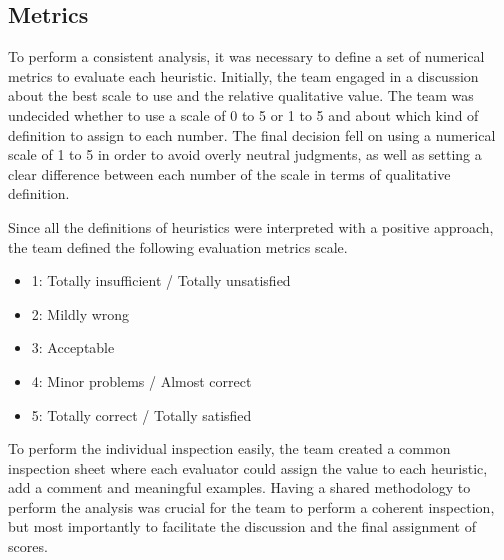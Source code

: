 
\subsection{Metrics}

To perform a consistent analysis, it was necessary to define a set of numerical metrics to evaluate each heuristic.
Initially, the team engaged in a discussion about the best scale to use and the relative qualitative value. The team was undecided whether to use a scale of 0 to 5 or 1 to 5 and about which kind of definition to assign to each number.
The final decision fell on using a numerical scale of 1 to 5 in order to avoid overly neutral judgments, as well as setting a clear difference between each number of the scale in terms of qualitative definition. 

Since all the definitions of heuristics were interpreted with a positive approach, the team defined the following evaluation metrics scale.
\begin{itemize}
    \item 1: Totally insufficient / Totally unsatisfied
    \item 2: Mildly wrong
    \item 3: Acceptable
    \item 4: Minor problems / Almost correct
    \item 5: Totally correct / Totally satisfied
\end{itemize}

To perform the individual inspection easily, the team created a common inspection sheet where each evaluator could assign the value to each heuristic, add a comment and meaningful examples. Having a shared methodology to perform the analysis was crucial for the team to perform a coherent inspection, but most importantly to facilitate the discussion and the final assignment of scores.